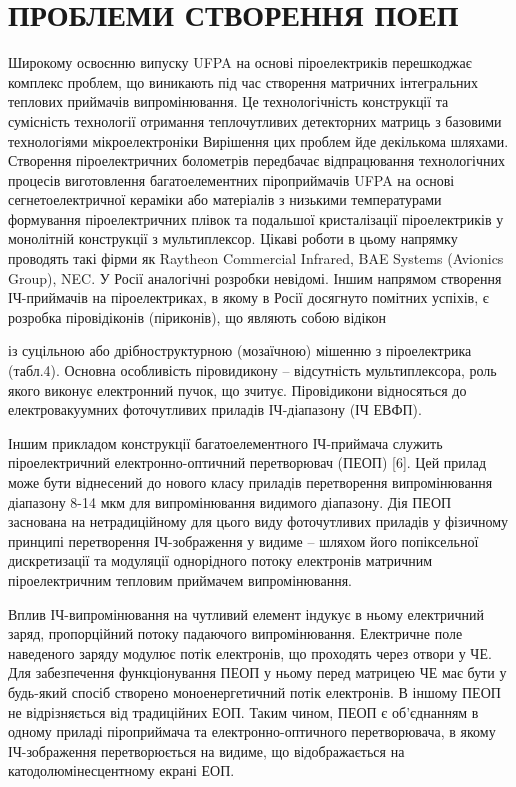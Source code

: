 \documentclass[a4paper,14pt]{extreport}
\begin{document}
\chapter{ПРОБЛЕМИ СТВОРЕННЯ ПОЕП}\par
Широкому освоєнню випуску UFPA на основі піроелектриків перешкоджає комплекс проблем, що виникають під час створення матричних інтегральних теплових приймачів випромінювання. Це технологічність
конструкції та сумісність технології отримання теплочутливих детекторних матриць з базовими технологіями мікроелектроніки
Вирішення цих проблем йде декількома шляхами. Створення піроелектричних болометрів передбачає відпрацювання технологічних
процесів виготовлення багатоелементних піроприймачів UFPA на
основі сегнетоелектричної кераміки або матеріалів з низькими
температурами формування піроелектричних плівок та подальшої кристалізації піроелектриків у монолітній конструкції з
мультиплексор. Цікаві роботи в цьому напрямку проводять такі фірми як Raytheon Commercial Infrared, BAE Systems
(Avionics Group), NEC. У Росії аналогічні розробки невідомі.
Іншим напрямом створення ІЧ-приймачів на піроелектриках, в якому в Росії досягнуто помітних успіхів, є розробка піровідіконів (піриконів), що являють собою відікон

із суцільною або дрібноструктурною (мозаїчною) мішенню з піроелектрика (табл.4). Основна особливість піровидикону – відсутність
мультиплексора, роль якого виконує електронний пучок, що зчитує. Піровідикони відносяться до електровакуумних фоточутливих приладів ІЧ-діапазону (ІЧ ЕВФП).
\begin{figure}[h!]

\label{ris2}
\end{figure}


Іншим прикладом конструкції багатоелементного ІЧ-приймача
служить піроелектричний електронно-оптичний перетворювач
(ПЕОП) [6]. Цей прилад може бути віднесений до нового класу приладів перетворення випромінювання діапазону 8-14 мкм для випромінювання видимого діапазону. Дія ПЕОП заснована на нетрадиційному для
цього виду фоточутливих приладів у фізичному принципі перетворення ІЧ-зображення у видиме – шляхом його попіксельної
дискретизації та модуляції однорідного потоку електронів матричним піроелектричним тепловим приймачем випромінювання.\par

Вплив ІЧ-випромінювання на чутливий елемент індукує в ньому електричний заряд, пропорційний потоку падаючого
випромінювання. Електричне поле наведеного заряду модулює потік
електронів, що проходять через отвори у ЧЕ. Для забезпечення
функціонування ПЕОП у ньому перед матрицею ЧЕ має бути у будь-який спосіб створено моноенергетичний потік електронів.
В іншому ПЕОП не відрізняється від традиційних ЕОП. Таким чином, ПЕОП є об'єднанням в одному приладі піроприймача та електронно-оптичного перетворювача, в якому
ІЧ-зображення перетворюється на видиме, що відображається на катодолюмінесцентному екрані ЕОП.
\end{document}
